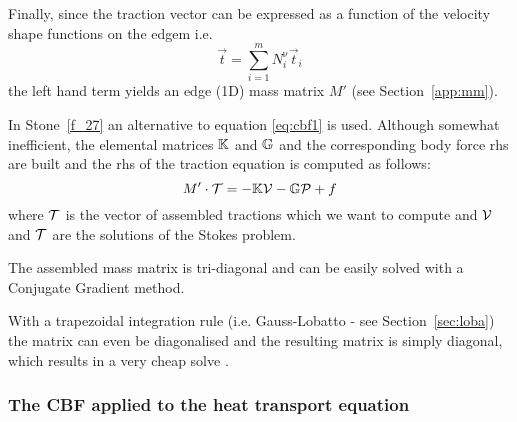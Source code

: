Finally, since the traction vector can be expressed as a function of the velocity 
shape functions on the edgem i.e.
\[
\vec{t} = \sum_{i=1}^m N_i^\upnu \vec{t}_i
\]
the left hand term yields an edge (1D) mass matrix $M'$ (see Section~\ref{app:mm}).

\begin{remark}
In Stone~\ref{f_27} an alternative to equation \ref{eq:cbf1} is used. Although
somewhat inefficient, the elemental matrices ${\mathbb{K}}$ and ${\mathbb{G}}$ and the corresponding 
body force rhs are built and the rhs of the traction equation is computed as follows:
\[
M' \cdot {\cal T} = -{\mathbb{K}} {\cal V} - {\mathbb{G}} {\cal P} + f
\]
where ${\cal T}$ is the vector of assembled tractions which we want to compute 
and ${\cal V}$ and ${\cal T}$ are the solutions of the Stokes problem. 
\end{remark}

\begin{remark} 
The assembled mass matrix is tri-diagonal and can be easily solved with 
a Conjugate Gradient method. 
\end{remark}

\begin{remark} 
With a trapezoidal integration rule 
(i.e. Gauss-Lobatto - see Section~\ref{sec:loba}) the matrix can even be diagonalised and the resulting 
matrix is simply diagonal, which results in a very cheap solve \cite{zhgh93}.
\end{remark}

\subsubsection{The CBF applied to the heat transport equation}


